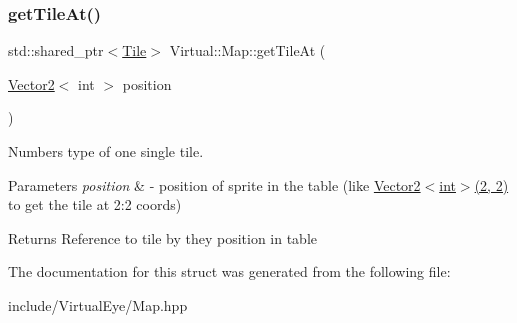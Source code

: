 \subsubsection{\texorpdfstring{get\+Tile\+At()}{getTileAt()}}
{\footnotesize\ttfamily std\+::shared\+\_\+ptr$<$\hyperlink{class_virtual_1_1_tile}{Tile}$>$ Virtual\+::\+Map\+::get\+Tile\+At (\begin{DoxyParamCaption}\item[{\hyperlink{struct_virtual_1_1_vector2}{Vector2}$<$ int $>$}]{position }\end{DoxyParamCaption})\hspace{0.3cm}{\ttfamily [inline]}}



Numbers type of one single tile. 


\begin{DoxyParams}{Parameters}
{\em position} & -\/ position of sprite in the table (like \hyperlink{struct_virtual_1_1_vector2}{Vector2$<$int$>$(2, 2)} to get the tile at 2\+:2 coords)\\
\hline
\end{DoxyParams}
\begin{DoxyReturn}{Returns}
Reference to tile by they position in table 
\end{DoxyReturn}


The documentation for this struct was generated from the following file\+:\begin{DoxyCompactItemize}
\item 
include/\+Virtual\+Eye/Map.\+hpp\end{DoxyCompactItemize}
